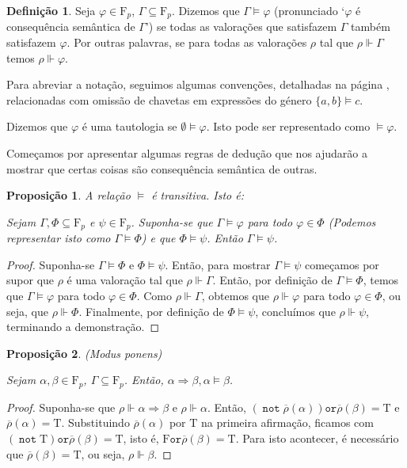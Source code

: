 \documentclass{report}
\newtheorem{prop}{Proposição}
\theoremstyle{definition}
\newtheorem{definicao}{Definição}
\theoremstyle{remark}
\newcommand{\F}{\mathrm{F}}
\newcommand{\lt}{\mathrm{T}}
\newcommand{\lf}{\mathrm{F}}
\DeclareMathOperator{\pnot}{\texttt{not}}
\newcommand{\por}{\mathbin{\texttt{or}}}
\newcommand{\imply}{\mathbin{\Rightarrow}}
\begin{document}
	\begin{definicao}
	Seja $\varphi \in \F_p$, $\Gamma \subseteq \F_p$. Dizemos que $\Gamma \vDash \varphi$ (pronunciado `$\varphi$ é consequência semântica de $\Gamma$') se todas as valorações que satisfazem $\Gamma$ também satisfazem $\varphi$. Por outras palavras, se para todas as valorações $\rho$ tal que $\rho \Vdash \Gamma$ temos $\rho \Vdash \varphi$.
	
	Para abreviar a notação, seguimos algumas convenções, detalhadas na página \pageref{convencao:consequencia}, relacionadas com omissão de chavetas em expressões do género $\{a, b\} \vDash c$.
	
	Dizemos que $\varphi$ é uma tautologia se $\emptyset \vDash \varphi$. Isto pode ser representado como $\vDash \varphi$.
	\end{definicao}
	
	Começamos por apresentar algumas regras de dedução que nos ajudarão a mostrar que certas coisas são consequência semântica de outras.
	
	\begin{prop}
	A relação $\vDash$ é transitiva. Isto é:
	
	Sejam $\Gamma, \Phi \subseteq \F_p$ e $\psi \in \F_p$. Suponha-se que $\Gamma \vDash \varphi$ para todo $\varphi \in \Phi$ (Podemos representar isto como $\Gamma \vDash \Phi$) e que $\Phi \vDash \psi$. Então $\Gamma \vDash \psi$.
	\end{prop}
	
	\begin{proof} Suponha-se $\Gamma \vDash \Phi$ e $\Phi \vDash \psi$. Então, para mostrar $\Gamma \vDash \psi$ começamos por supor que $\rho$ é uma valoração tal que $\rho \Vdash \Gamma$. Então, por definição de $\Gamma \vDash \Phi$, temos que $\Gamma \vDash \varphi$ para todo $\varphi \in \Phi$. Como $\rho \Vdash \Gamma$, obtemos que $\rho \Vdash \varphi$ para todo $\varphi \in \Phi$, ou seja, que $\rho \Vdash \Phi$. Finalmente, por definição de $\Phi \vDash \psi$, concluímos que $\rho \Vdash \psi$, terminando a demonstração.
	\end{proof}
	
	\begin{prop} (\textit{Modus ponens}) 
	
	Sejam $\alpha, \beta \in \F_p$, $\Gamma \subseteq \F_p$. Então, $\alpha \imply \beta, \alpha \vDash \beta$.
	\end{prop}
	
	\begin{proof}
	Suponha-se que $\rho \Vdash \alpha \imply \beta$ e $\rho \Vdash \alpha$. Então, $(\pnot\overline\rho(\alpha))\por\overline\rho(\beta) = \lt$ e $\overline\rho(\alpha) = \lt$. Substituindo $\overline\rho(\alpha)$ por $\lt$ na primeira afirmação, ficamos com $(\pnot\lt)\por\overline\rho(\beta) = \lt$, isto é, $\lf \por \overline\rho(\beta) = \lt$. Para isto acontecer, é necessário que $\overline\rho(\beta) = \lt$, ou seja, $\rho \Vdash \beta$.
	\end{proof}
	
\end{document}
